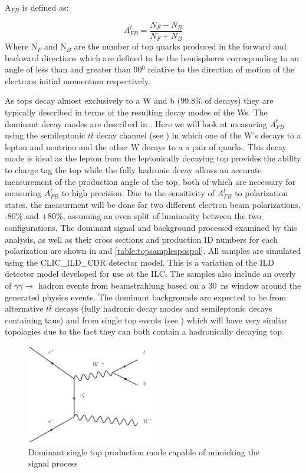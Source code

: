 A$_{FB}$ is defined as:

\begin{equation}
A_{FB}^t=\frac{N_F-N_B}{N_F+N_B}
\end{equation}
Where N$_{F}$ and N$_{B}$ are the number of top quarks produced in the forward and backward directions which are defined to be the hemispheres corresponding to an angle of less than and greater than 90$^0$ relative to the direction of motion of the electrons initial momentum respectively.

As tops decay almost exclusively to a W and b (99.8\% of decays) they are typically described in terms of the resulting decay modes of the Ws. The dominant decay modes are described in . Here we will look at measuring $A_{FB}^{t}$ using the semileptonic $t\bar{t}$ decay channel (see ) in which one of the W's decays to a lepton and neutrino and the other W decays to a a pair of quarks. This decay mode is ideal as the lepton from the leptonically decaying top provides the ability to charge tag the top while the fully hadronic decay allows an accurate measurement of the production angle of the top, both of which are necessary for measuring $A_{FB}^{t}$ to high precision. Due to the sensitivity of $A_{FB}^{t}$ to polarization states, the measurment will be done for two different electron beam polarizations, -80\% and +80\%, assuming an even split of luminosity between the two configurations. The dominant signal and background processed examined by this analysis, as well as their cross sections and production ID numbers for each polarization are shown in  and \ref{table:topsamplespospol}. All samples are simulated using the CLIC\_ILD\_CDR detector model. This is a variation of the ILD detector model developed for use at the ILC. The samples also include an overly of $\gamma\gamma\rightarrow$ hadron events from beamstrahlung based on a 30~ns window around the generated physics events. The dominant backgrounds are expected to be from alternative $t\bar{t}$ decays (fully hadronic decay modes and semileptonic decays containing taus) and from single top events (see ) which will have very simliar topologies due to the fact they can both contain a hadronically decaying top.

\begin{figure}
  \centering
  \includegraphics[width=0.5\textwidth]{TopAnalysis/figures/SingleTop}
  \caption[Dominant single top production mode]{Dominant single top production mode capable of mimicking the signal process}
  \label{fig:singletop}
\end{figure}

